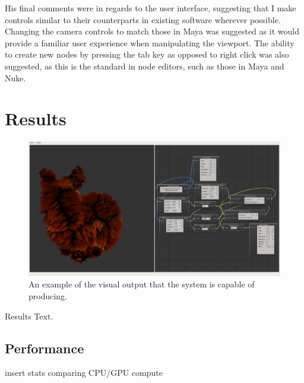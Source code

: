 \documentclass[]{acmsiggraph}
\begin{document}
His final comments were in regards to the user interface, suggesting that I make controls similar to their counterparts in existing software wherever possible. Changing the camera controls to match those in Maya was suggested as it would provide a familiar user experience when manipulating the viewport. The ability to create new nodes by pressing the tab key as opposed to right click was also suggested, as this is the standard in node editors, such as those in Maya and Nuke.

\section{Results} \label{sec:results}

\begin{figure}[htbp]\centering
\includegraphics[width=1.0\linewidth]{images/test_0007}
\caption{\label{figure:screenshot} An example of the visual output that the system is capable of producing.}
\end{figure}

Results Text.

\subsection{Performance} \label{sec:performance}

insert stats comparing CPU/GPU compute
\end{document}
